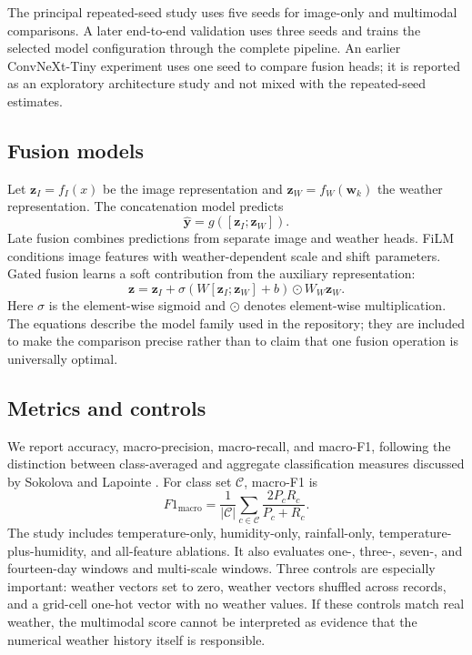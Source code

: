 \documentclass[conference]{IEEEtran}
\begin{document}
The principal repeated-seed study uses five seeds for image-only and multimodal comparisons. A later end-to-end validation uses three seeds and trains the selected model configuration through the complete pipeline. An earlier ConvNeXt-Tiny experiment uses one seed to compare fusion heads; it is reported as an exploratory architecture study and not mixed with the repeated-seed estimates.

\subsection{Fusion models}
Let $\mathbf{z}_{I}=f_I(x)$ be the image representation and $\mathbf{z}_{W}=f_W(\mathbf{w}_k)$ the weather representation. The concatenation model predicts
\begin{equation}
\hat{\mathbf{y}} = g([\mathbf{z}_{I};\mathbf{z}_{W}]).
\label{eq:concat}
\end{equation}
Late fusion combines predictions from separate image and weather heads. FiLM conditions image features with weather-dependent scale and shift parameters. Gated fusion learns a soft contribution from the auxiliary representation:
\begin{equation}
\mathbf{z} = \mathbf{z}_{I}+
\sigma\!\left(W[\mathbf{z}_{I};\mathbf{z}_{W}]+b\right)\odot W_W\mathbf{z}_{W}.
\label{eq:gate}
\end{equation}
Here $\sigma$ is the element-wise sigmoid and $\odot$ denotes element-wise multiplication. The equations describe the model family used in the repository; they are included to make the comparison precise rather than to claim that one fusion operation is universally optimal.

\subsection{Metrics and controls}
We report accuracy, macro-precision, macro-recall, and macro-F1, following the distinction between class-averaged and aggregate classification measures discussed by Sokolova and Lapointe \cite{scikit_metrics}. For class set $\mathcal{C}$, macro-F1 is
\begin{equation}
F1_{\mathrm{macro}}=\frac{1}{|\mathcal{C}|}
\sum_{c\in\mathcal{C}}\frac{2P_cR_c}{P_c+R_c}.
\label{eq:macrof1}
\end{equation}
The study includes temperature-only, humidity-only, rainfall-only, temperature-plus-humidity, and all-feature ablations. It also evaluates one-, three-, seven-, and fourteen-day windows and multi-scale windows. Three controls are especially important: weather vectors set to zero, weather vectors shuffled across records, and a grid-cell one-hot vector with no weather values. If these controls match real weather, the multimodal score cannot be interpreted as evidence that the numerical weather history itself is responsible.
\end{document}

